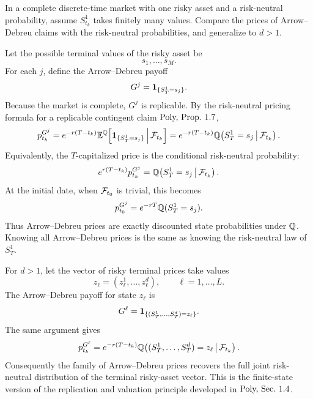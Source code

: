 \begin{exercise}
In a complete discrete-time market with one risky asset and a risk-neutral
probability, assume \(S^1_{t_k}\) takes finitely many values.  Compare the
prices of Arrow--Debreu claims with the risk-neutral probabilities, and
generalize to \(d>1\).
\end{exercise}

\begin{solution}
Let the possible terminal values of the risky asset be
\[
  s_1,\ldots,s_M.
\]
For each \(j\), define the Arrow--Debreu payoff
\[
  G^j=\mathbf{1}_{\{S^1_T=s_j\}}.
\]
Because the market is complete, \(G^j\) is replicable.  By the risk-neutral
pricing formula for a replicable contingent claim \(\textup{Poly, Prop.~1.7}\),
\[
  p^{G^j}_{t_k}
  =
  e^{-r(T-t_k)}
  \mathbb{E}^{\mathbb{Q}}\!\left[\mathbf{1}_{\{S^1_T=s_j\}}\,\middle|\,\mathcal{F}_{t_k}\right]
  =
  e^{-r(T-t_k)}
  \mathbb{Q}\!\left(S^1_T=s_j\,\middle|\,\mathcal{F}_{t_k}\right).
\]
Equivalently, the \(T\)-capitalized price is the conditional risk-neutral
probability:
\[
  e^{r(T-t_k)}p^{G^j}_{t_k}
  =
  \mathbb{Q}\!\left(S^1_T=s_j\,\middle|\,\mathcal{F}_{t_k}\right).
\]
At the initial date, when \(\mathcal{F}_{t_0}\) is trivial, this becomes
\[
  p^{G^j}_{t_0}
  =
  e^{-rT}\mathbb{Q}(S^1_T=s_j).
\]
Thus Arrow--Debreu prices are exactly discounted state probabilities under
\(\mathbb{Q}\).  Knowing all Arrow--Debreu prices is the same as knowing the
risk-neutral law of \(S^1_T\).

For \(d>1\), let the vector of risky terminal prices take values
\[
  z_\ell=(z_\ell^1,\ldots,z_\ell^d),\qquad \ell=1,\ldots,L.
\]
The Arrow--Debreu payoff for state \(z_\ell\) is
\[
  G^\ell=\mathbf{1}_{\{(S^1_T,\ldots,S^d_T)=z_\ell\}}.
\]
The same argument gives
\[
  p^{G^\ell}_{t_k}
  =
  e^{-r(T-t_k)}
  \mathbb{Q}\!\left((S^1_T,\ldots,S^d_T)=z_\ell\,\middle|\,\mathcal{F}_{t_k}\right).
\]
Consequently the family of Arrow--Debreu prices recovers the full joint
risk-neutral distribution of the terminal risky-asset vector.  This is the
finite-state version of the replication and valuation principle developed in
\(\textup{Poly, Sec.~1.4}\).
\end{solution}

